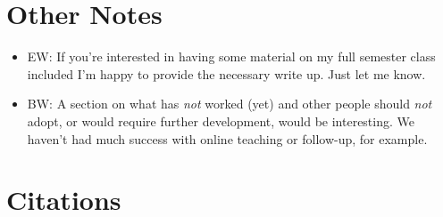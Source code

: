 \documentclass{article}
\begin{document}
\section{Other Notes}

\begin{itemize}

  \item EW: If you're interested in having some material on my full
    semester class included I'm happy to provide the necessary write
    up. Just let me know.

  \item BW: A section on what has {\em not} worked (yet) and other people
    should {\em not} adopt, or would require further development, would
    be interesting. We haven't had much success with online teaching or
    follow-up, for example.

\end{itemize}

\section{Citations}

\cite{hannay2009} \cite{prabhu2011} \cite{wilson1996}
\cite{wilson2006a} \cite{wilson2006b} \cite{wilson2009}



\end{document}
